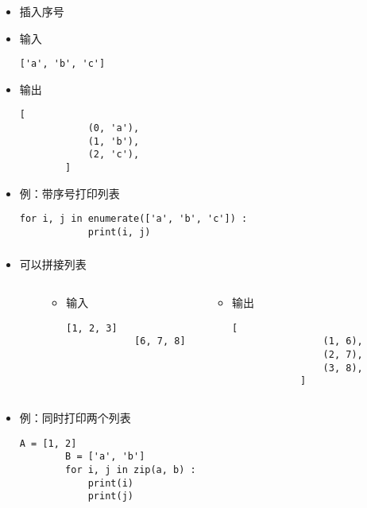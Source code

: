 \begin{CJK}{UTF8}{gbsn}
\begin{frame} [fragile]
	\frametitle{}
	\begin{itemize}
	\item {}插入序号
	\item 输入
		\begin{lstlisting}[style=pythonstyle, gobble=8, texcl]
		['a', 'b', 'c']
		\end{lstlisting}
	\item 输出
		\begin{lstlisting}[style=pythonstyle, gobble=8, texcl]
		[
			(0, 'a'),
			(1, 'b'),
			(2, 'c'),
		]
		\end{lstlisting}
	\item 例：带序号打印列表
		\begin{lstlisting}[style=pythonstyle, gobble=8, texcl]
		for i, j in enumerate(['a', 'b', 'c']) :
			print(i, j)
		\end{lstlisting}
	\end{itemize}
\end{frame}

\begin{frame} [fragile]
	\frametitle{}
	\begin{itemize}
	\item {}可以拼接列表
	\begin{columns}
		\begin{column}[T]{.1\textwidth}
		\end{column}
		\begin{column}[T]{.4\textwidth}
			\begin{itemize}
			\item 输入
			\begin{lstlisting}[style=pythonstyle, gobble=12, texcl]
			[1, 2, 3]
			[6, 7, 8]
			\end{lstlisting}
			\end{itemize}
		\end{column}
		\begin{column}[T]{.4\textwidth}
			\begin{itemize}
			\item 输出
			\begin{lstlisting}[style=pythonstyle, gobble=12, texcl]
			[
				(1, 6),
				(2, 7),
				(3, 8),
			]
			\end{lstlisting}
			\end{itemize}
		\end{column}
		\begin{column}[T]{.1\textwidth}
		\end{column}
	\end{columns}
	\item 例：同时打印两个列表
		\begin{lstlisting}[style=pythonstyle, gobble=8, texcl]
		A = [1, 2]
		B = ['a', 'b']
		for i, j in zip(a, b) :
			print(i)
			print(j)
		\end{lstlisting}
	\end{itemize}
\end{frame}


\end{CJK}
